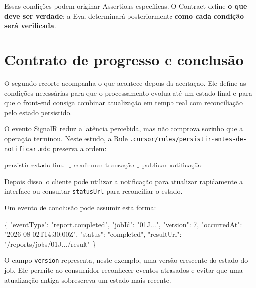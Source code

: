 \documentclass[
  10pt,
  a4paper,
  oneside]{book}
\newenvironment{Shaded}{}{}
\newcommand{\DataTypeTok}[1]{\textcolor[rgb]{0.56,0.13,0.00}{#1}}
\newcommand{\DecValTok}[1]{\textcolor[rgb]{0.25,0.63,0.44}{#1}}
\newcommand{\FunctionTok}[1]{\textcolor[rgb]{0.02,0.16,0.49}{#1}}
\newcommand{\NormalTok}[1]{#1}
\newcommand{\StringTok}[1]{\textcolor[rgb]{0.25,0.44,0.63}{#1}}
\renewenvironment{Shaded}{\begin{snugshade}}{\end{snugshade}}%
\begin{document}
Essas condições podem originar Assertions específicas. O Contract define
\textbf{o que deve ser verdade}; a Eval determinará posteriormente
\textbf{como cada condição será verificada}.

\hypertarget{contrato-de-progresso-e-conclusuxe3o}{%
\section{Contrato de progresso e
conclusão}\label{contrato-de-progresso-e-conclusuxe3o}}

O segundo recorte acompanha o que acontece depois da aceitação. Ele
define as condições necessárias para que o processamento evolua até um
estado final e para que o front-end consiga combinar atualização em
tempo real com reconciliação pelo estado persistido.

O evento SignalR reduz a latência percebida, mas não comprova sozinho
que a operação terminou. Neste estudo, a Rule
\texttt{.cursor/rules/persistir-antes-de-notificar.mdc} preserva a
ordem:

\begin{Shaded}
\begin{Highlighting}[]
\NormalTok{persistir estado final}
\NormalTok{        ↓}
\NormalTok{confirmar transação}
\NormalTok{        ↓}
\NormalTok{publicar notificação}
\end{Highlighting}
\end{Shaded}

Depois disso, o cliente pode utilizar a notificação para atualizar
rapidamente a interface ou consultar \texttt{statusUrl} para reconciliar
o estado.

Um evento de conclusão pode assumir esta forma:

\begin{Shaded}
\begin{Highlighting}[]
\FunctionTok{\{}
  \DataTypeTok{"eventType"}\FunctionTok{:} \StringTok{"report.completed"}\FunctionTok{,}
  \DataTypeTok{"jobId"}\FunctionTok{:} \StringTok{"01J..."}\FunctionTok{,}
  \DataTypeTok{"version"}\FunctionTok{:} \DecValTok{7}\FunctionTok{,}
  \DataTypeTok{"occurredAt"}\FunctionTok{:} \StringTok{"2026{-}08{-}02T14:30:00Z"}\FunctionTok{,}
  \DataTypeTok{"status"}\FunctionTok{:} \StringTok{"completed"}\FunctionTok{,}
  \DataTypeTok{"resultUrl"}\FunctionTok{:} \StringTok{"/reports/jobs/01J.../result"}
\FunctionTok{\}}
\end{Highlighting}
\end{Shaded}

O campo \texttt{version} representa, neste exemplo, uma versão crescente
do estado do job. Ele permite ao consumidor reconhecer eventos atrasados
e evitar que uma atualização antiga sobrescreva um estado mais recente.
\end{document}
